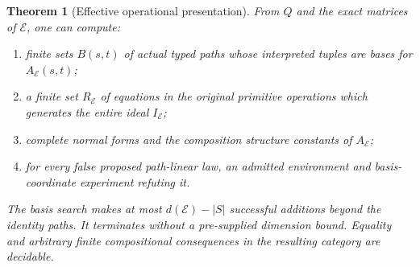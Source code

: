 \documentclass[11pt]{article}
\newtheorem{theorem}{Theorem}[section]
\theoremstyle{definition}
\theoremstyle{remark}\newtheorem{remark}[theorem]{Remark}
\begin{document}
\begin{theorem}[Effective operational presentation]\label{ef:thm:effective}
From $Q$ and the exact matrices of $\mathcal E$, one can compute:
\begin{enumerate}
\item finite sets $B(s,t)$ of actual typed paths whose interpreted tuples
      are bases for $A_{\mathcal E}(s,t)$;
\item a finite set $R_{\mathcal E}$ of equations in the original primitive
      operations which generates the entire ideal $I_{\mathcal E}$;
\item complete normal forms and the composition structure constants of
      $A_{\mathcal E}$;
\item for every false proposed path-linear law, an admitted environment
      and basis-coordinate experiment refuting it.
\end{enumerate}
The basis search makes at most $d(\mathcal E)-|S|$ successful additions
beyond the identity paths. It terminates without a pre-supplied dimension
bound. Equality and arbitrary finite compositional consequences in the
resulting category are decidable.
\end{theorem}
\end{document}

